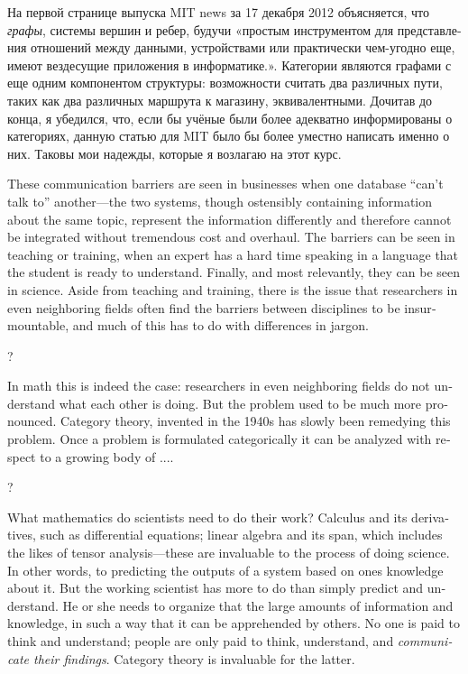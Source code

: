 \documentclass[a4paper]{book}
\theoremstyle{myth}
\begin{document}
\begin{english}
\begin{russian}На первой странице выпуска MIT news за 17 декабря 2012 объясняется, что {\em графы}, системы вершин и ребер, будучи «простым инструментом для представления отношений между данными, устройствами или практически чем-угодно еще, имеют вездесущие приложения в информатике.»\cite{http://web.mit.edu/newsoffice/2012/explained-graphs-computer-science-1217.html}. Категории являются графами с еще одним компонентом структуры: возможности считать два различных пути, таких как два различных маршрута к магазину, эквивалентными. Дочитав до конца, я убедился, что, если бы учёные были более адекватно информированы о категориях, данную статью для MIT было бы более уместно написать именно о них. Таковы мои надежды, которые я возлагаю на этот курс. \end{russian}

These communication barriers are seen in businesses when one database “can't talk to” another---the two systems, though ostensibly containing information about the same topic, represent the information differently and therefore cannot be integrated without tremendous cost and overhaul. The barriers can be seen in teaching or training, when an expert has a hard time speaking in a language that the student is ready to understand. Finally, and most relevantly, they can be seen in science. Aside from teaching and training, there is the issue that researchers in even neighboring fields often find the barriers between disciplines to be insurmountable, and much of this has to do with differences in jargon.

\begin{russian}? \end{russian}

In math this is indeed the case: researchers in even neighboring fields do not understand what each other is doing. But the problem used to be much more pronounced. Category theory, invented in the 1940s has slowly been remedying this problem. Once a problem is formulated categorically it can be analyzed with respect to a growing body of ....

\begin{russian}? \end{russian}

What mathematics do scientists need to do their work? Calculus and its derivatives, such as differential equations; linear algebra and its span, which includes the likes of tensor analysis---these are invaluable to the process of doing science. In other words, to predicting the outputs of a system based on ones knowledge about it. But the working scientist has more to do than simply predict and understand. He or she needs to organize that the large amounts of information and knowledge, in such a way that it can be apprehended by others. No one is paid to think and understand; people are only paid to think, understand, and {\em communicate their findings}. Category theory is invaluable for the latter.


\end{english}
\end{document}
